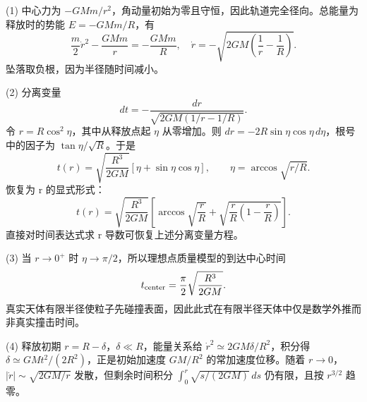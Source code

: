(1) 中心力为 \(-GMm/r^2\)，角动量初始为零且守恒，因此轨道完全径向。总能量为释放时的势能 \(E=-GMm/R\)，有
\[
\frac m2\dot r^2-\frac{GMm}{r}=-\frac{GMm}{R},\quad
\dot r=-\sqrt{2GM\left(\frac1r-\frac1R\right)}.
\]
坠落取负根，因为半径随时间减小。

(2) 分离变量
\[
dt=-\frac{dr}{\sqrt{2GM(1/r-1/R)}}.
\]
令 \(r=R\cos^2\eta\)，其中从释放点起 \(\eta\) 从零增加。则 \(dr=-2R\sin\eta\cos\eta\,d\eta\)，根号中的因子为 \(\tan\eta/\sqrt R\)。于是
\[
t(r)=\sqrt{\frac{R^3}{2GM}}
\left[\eta+\sin\eta\cos\eta\right],
\qquad \eta=\arccos\sqrt{r/R}.
\]
恢复为 r 的显式形式：
\[
t(r)=\sqrt{\frac{R^3}{2GM}}\left[
\arccos\sqrt{\frac rR}+\sqrt{\frac rR(1-\frac rR)}\right].
\]
直接对时间表达式求 r 导数可恢复上述分离变量方程。

(3) 当 \(r\to 0^{+}\) 时 \(\eta\to\pi/2\)，所以理想点质量模型的到达中心时间
\[
t_{\rm center}=\frac\pi2\sqrt{\frac{R^3}{2GM}}.
\]
真实天体有限半径使粒子先碰撞表面，因此此式在有限半径天体中仅是数学外推而非真实撞击时间。

(4) 释放初期 \(r=R-\delta\)，\(\delta\ll R\)，能量关系给 \(\dot r^2\simeq 2GM\delta/R^2\)，积分得 \(\delta\simeq GMt^2/(2R^2)\)，正是初始加速度 \(GM/R^2\) 的常加速度位移。随着 \(r\to 0\)，\(|\dot r|\sim\sqrt{2GM/r}\) 发散，但剩余时间积分 \(\int_0^r\sqrt{s/(2GM)}\,ds\) 仍有限，且按 \(r^{3/2}\) 趋零。
